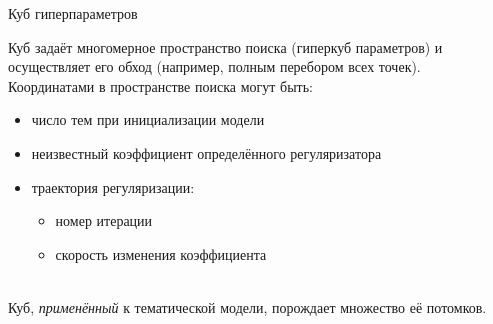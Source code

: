 \begin{frame}[t]{Куб гиперпараметров}

Куб задаёт многомерное пространство поиска (гиперкуб параметров) и осуществляет его обход (например, полным перебором всех точек). \\
\medskip
Координатами в пространстве поиска могут быть:

\begin{minipage}{0.5\textwidth}
{\small
    \begin{itemize}
        \setlength\itemsep{0em}
        \item число тем при инициализации модели
        \item неизвестный коэффициент определённого регуляризатора
        \item траектория регуляризации: \begin{itemize}
            \item номер итерации %
            \item скорость изменения коэффициента %
        \end{itemize}
    \end{itemize}
}
\end{minipage}
\begin{minipage}{0.4\textwidth}
\end{minipage}\\
\medskip
Куб, \textit{применённый} к тематической модели, порождает множество её потомков.


\end{frame}
